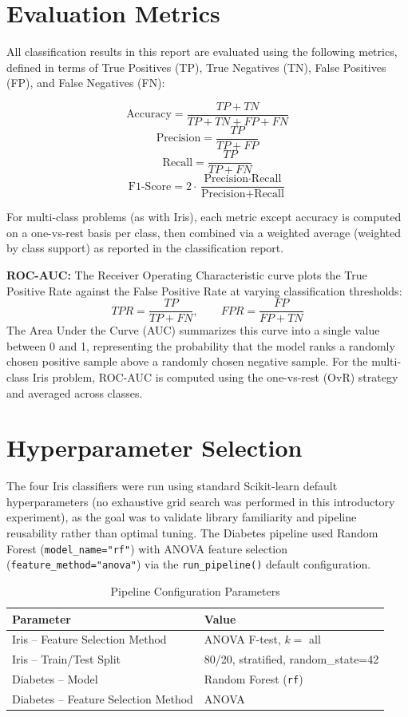 \documentclass[12pt,a4paper]{article}
\begin{document}
\section{Evaluation Metrics}

All classification results in this report are evaluated using the following metrics, defined in terms of True Positives (TP), True Negatives (TN), False Positives (FP), and False Negatives (FN):

\[
\text{Accuracy} = \frac{TP+TN}{TP+TN+FP+FN}
\]
\[
\text{Precision} = \frac{TP}{TP+FP}
\]
\[
\text{Recall} = \frac{TP}{TP+FN}
\]
\[
\text{F1-Score} = 2 \cdot \frac{\text{Precision} \cdot \text{Recall}}{\text{Precision}+\text{Recall}}
\]

For multi-class problems (as with Iris), each metric except accuracy is computed on a one-vs-rest basis per class, then combined via a weighted average (weighted by class support) as reported in the classification report.

\textbf{ROC-AUC:} The Receiver Operating Characteristic curve plots the True Positive Rate against the False Positive Rate at varying classification thresholds:
\[
TPR = \frac{TP}{TP+FN}, \qquad FPR = \frac{FP}{FP+TN}
\]
The Area Under the Curve (AUC) summarizes this curve into a single value between 0 and 1, representing the probability that the model ranks a randomly chosen positive sample above a randomly chosen negative sample. For the multi-class Iris problem, ROC-AUC is computed using the one-vs-rest (OvR) strategy and averaged across classes.

\section{Hyperparameter Selection}

The four Iris classifiers were run using standard Scikit-learn default hyperparameters (no exhaustive grid search was performed in this introductory experiment), as the goal was to validate library familiarity and pipeline reusability rather than optimal tuning. The Diabetes pipeline used Random Forest (\texttt{model\_name="rf"}) with ANOVA feature selection (\texttt{feature\_method="anova"}) via the \texttt{run\_pipeline()} default configuration.

\begin{table}[H]
\centering
\begin{tabular}{ll}
\toprule
Parameter & Value \\
\midrule
Iris -- Feature Selection Method & ANOVA F-test, $k=$ all \\
Iris -- Train/Test Split & 80/20, stratified, random\_state=42 \\
Diabetes -- Model & Random Forest (\texttt{rf}) \\
Diabetes -- Feature Selection Method & ANOVA \\
\bottomrule
\end{tabular}
\caption{Pipeline Configuration Parameters}
\end{table}
\end{document}
